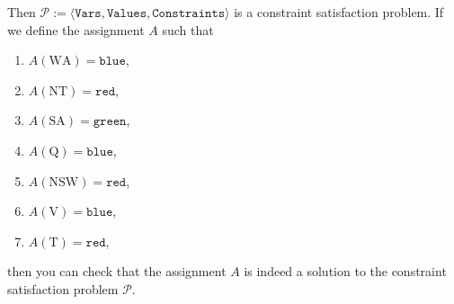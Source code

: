 Then $\mathcal{P} := \langle \texttt{Vars}, \texttt{Values}, \texttt{Constraints} \rangle$ is a constraint satisfaction problem.  
If we define the assignment $A$ such that
\begin{enumerate}
\item $A(\mathrm{WA}) = \texttt{blue}$,
\item $A(\mathrm{NT}) = \texttt{red}$,
\item $A(\mathrm{SA}) = \texttt{green}$,
\item $A(\mathrm{Q}) = \texttt{blue}$,
\item $A(\mathrm{NSW}) = \texttt{red}$,
\item $A(\mathrm{V}) = \texttt{blue}$,
\item $A(\mathrm{T}) = \texttt{red}$,
\end{enumerate}
then you can check that the assignment $A$ is indeed a solution to the constraint satisfaction problem $\mathcal{P}$.

